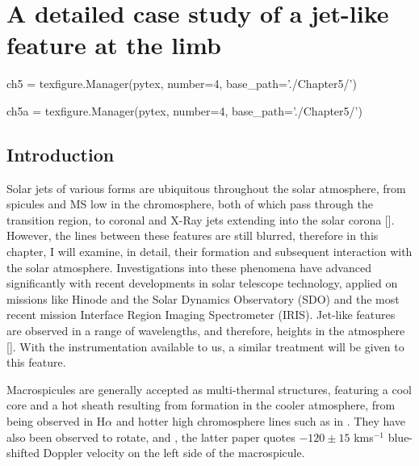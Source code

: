 


\chapter{A detailed case study of a jet-like feature at the limb}
\label{ch:5}
\begin{pycode}[chapter5]
ch5 = texfigure.Manager(pytex, number=4, base_path='./Chapter5/')
\end{pycode}
\begin{pycode}[chapter5a]
ch5a = texfigure.Manager(pytex, number=4, base_path='./Chapter5/')
\end{pycode}


\section{Introduction}
Solar jets of various forms are ubiquitous throughout the solar atmosphere, from spicules and MS low in the chromosphere, both of which pass through the transition region, to coronal and X-Ray jets extending into the solar corona [\cite{Archontis2008,Majarska2011,Morton2012}].
However, the lines between these features are still blurred, therefore in this chapter, I will examine, in detail, their formation and subsequent interaction with the solar atmosphere.
Investigations into these phenomena have advanced significantly with recent developments in solar telescope technology, applied on missions like Hinode and the Solar Dynamics Observatory (SDO) and the most recent mission Interface Region Imaging Spectrometer (IRIS).
Jet-like features are observed in a range of wavelengths, and therefore, heights in the atmosphere [\cite{Wang1998,Yamaucho2004}].
With the instrumentation available to us, a similar treatment will be given to this feature. 

Macrospicules are generally accepted as multi-thermal structures, featuring a cool core and a hot sheath resulting from formation in the cooler atmosphere, from being observed in H$\alpha$ \citep{LaBonte79} and hotter high chromosphere lines such as in \cite{Parenti2002}.
They have also been observed to rotate, \cite{Pike_Mason1998} and \cite{Kamio2010}, the latter paper quotes $-120 \pm 15$ kms$^{-1}$ blue-shifted Doppler velocity on the left side of the macrospicule. 

